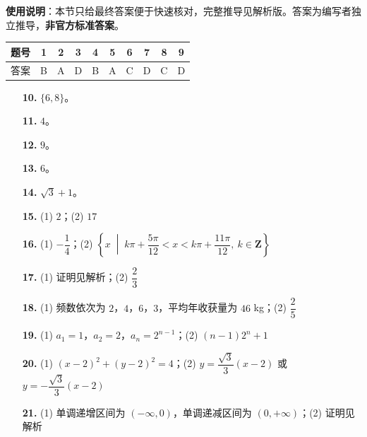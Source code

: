
\begin{gknotice}
\textbf{使用说明}：本节只给最终答案便于快速核对，完整推导见解析版。答案为编写者独立推导，\textbf{非官方标准答案}。
\end{gknotice}

\begin{center}\begin{tabular}{cccccccccc}
\toprule
题号 & 1 & 2 & 3 & 4 & 5 & 6 & 7 & 8 & 9 \\
\midrule
答案 & B & A & D & B & A & C & D & C & D \\
\bottomrule
\end{tabular}\end{center}

\begin{itemize}[leftmargin=2.6em]
  \item[\textbf{10.}] $\{6,8\}$。
  \item[\textbf{11.}] $4$。
  \item[\textbf{12.}] $9$。
  \item[\textbf{13.}] $6$。
  \item[\textbf{14.}] $\sqrt3+1$。
  \item[\textbf{15.}] (1) $2$；(2) $17$
\end{itemize}

\begin{itemize}[leftmargin=2.6em]
  \item[\textbf{16.}] (1) $-\dfrac14$；(2) $\left\{x\;\middle|\;k\pi+\dfrac{5\pi}{12}<x<k\pi+\dfrac{11\pi}{12},\ k\in\mathbf Z\right\}$
  \item[\textbf{17.}] (1) 证明见解析；(2) $\dfrac23$
  \item[\textbf{18.}] (1) 频数依次为 $2$，$4$，$6$，$3$，平均年收获量为 $46$ kg；(2) $\dfrac25$
  \item[\textbf{19.}] (1) $a_1=1$，$a_2=2$，$a_n=2^{n-1}$；(2) $(n-1)2^n+1$
  \item[\textbf{20.}] (1) $(x-2)^2+(y-2)^2=4$；(2) $y=\dfrac{\sqrt3}3(x-2)$ 或 $y=-\dfrac{\sqrt3}3(x-2)$
  \item[\textbf{21.}] (1) 单调递增区间为 $(-\infty,0)$，单调递减区间为 $(0,+\infty)$；(2) 证明见解析
\end{itemize}
